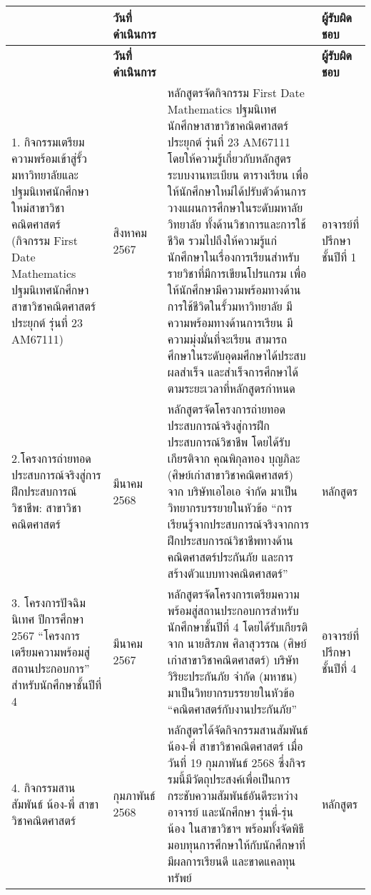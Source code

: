 \begin{longtable}{|>{\raggedright}p{}|>{\centering}p{}|>{\raggedright}p{}|>{\centering\arraybackslash}p{}|}
	\hline
	\centering{\textbf{โครงการ/กิจกรรม}}   & \textbf{วันที่ดำเนินการ} &  \centering{\textbf{ผลการดำเนินงาน}} & \textbf{ผู้รับผิดชอบ}  \\ \hline
	\endfirsthead
	\hline
	\centering{\textbf{โครงการ/กิจกรรม}}   & \textbf{วันที่ดำเนินการ} &  \centering{\textbf{ผลการดำเนินงาน}} & \textbf{ผู้รับผิดชอบ}  \\ \hline
	\endhead
	1.	กิจกรรมเตรียมความพร้อมเข้าสู่รั้วมหาวิทยาลัยและปฐมนิเทศนักศึกษาใหม่สาขาวิชาคณิตศาสตร์ (กิจกรรม First Date Mathematics ปฐมนิเทศนักศึกษาสาขาวิชาคณิตศาสตร์ประยุกต์ รุ่นที่ 23 AM67111)  & 9 สิงหาคม 2567 
	& หลักสูตรจัดกิจกรรม First Date Mathematics ปฐมนิเทศนักศึกษาสาขาวิชาคณิตศาสตร์ประยุกต์ รุ่นที่ 23 AM67111 โดยให้ความรู้เกี่ยวกับหลักสูตร ระบบงานทะเบียน ตารางเรียน  เพื่อให้นักศึกษาใหม่ได้ปรับตัวด้านการวางแผนการศึกษาในระดับมหาลัยวิทยาลัย ทั้งด้านวิชาการและการใช้ชีวิต รวมไปถึงให้ความรู้แก่นักศึกษาในเรื่องการเรียนสำหรับรายวิชาที่มีการเขียนโปรแกรม เพื่อให้นักศึกษามีความพร้อมทางด้านการใช้ชีวิตในรั้วมหาวิทยาลัย มีความพร้อมทางด้านการเรียน มีความมุ่งมั่นที่จะเรียน สามารถศึกษาในระดับอุดมศึกษาได้ประสบผลสำเร็จ และสำเร็จการศึกษาได้ตามระยะเวลาที่หลักสูตรกำหนด & อาจารย์ที่ปรึกษาชั้นปีที่ 1 \\ \hline
	2.โครงการถ่ายทอดประสบการณ์จริงสู่การฝึกประสบการณ์วิชาชีพ: สาขาวิชาคณิตศาสตร์  & 6 มีนาคม 2568 
	&  หลักสูตรจัดโครงการถ่ายทอดประสบการณ์จริงสู่การฝึกประสบการณ์วิชาชีพ โดยได้รับเกียรติจาก คุณพิกุลทอง บุญภิละ (ศิษย์เก่าสาขาวิชาคณิตศาสตร์) จาก บริษัทเอไอเอ จำกัด มาเป็นวิทยากรบรรยายในหัวข้อ ``การเรียนรู้จากประสบการณ์จริงจากการฝึกประสบการณ์วิชาชีพทางด้านคณิตศาสตร์ประกันภัย และการสร้างตัวแบบทางคณิตศาสตร์''
	& หลักสูตร \\ \hline
	3.	โครงการปัจฉิมนิเทศ ปีการศึกษา 2567 ``โครงการเตรียมความพร้อมสู่สถานประกอบการ'' สําหรับนักศึกษาชั้นปีที่ 4  & 7 มีนาคม 2567 & หลักสูตรจัดโครงการเตรียมความพร้อมสู่สถานประกอบการสําหรับนักศึกษาชั้นปีที่ 4 โดยได้รับเกียรติจาก นายสิรภพ ศิลาสุวรรณ (ศิษย์เก่าสาขาวิชาคณิตศาสตร์) บริษัทวิริยะประกันภัย จำกัด (มหาชน) มาเป็นวิทยากรบรรยายในหัวข้อ ``คณิตศาสตร์กับงานประกันภัย''  &  อาจารย์ที่ปรึกษาชั้นปีที่ 4\\ \hline
	4.	กิจกรรมสานสัมพันธ์ น้อง-พี่ สาขาวิชาคณิตศาสตร์   
	& 19 กุมภาพันธ์ 2568 & หลักสูตรได้จัดกิจกรรมสานสัมพันธ์ น้อง-พี่ สาขาวิชาคณิตศาสตร์ เมื่อวันที่ 19 กุมภาพันธ์ 2568 ซึ่งกิจรรมนี้มีวัตถุประสงค์เพื่อเป็นการกระชับความสัมพันธ์อันดีระหว่างอาจารย์ และนักศึกษา รุ่นพี่-รุ่นน้อง ในสาขาวิชาฯ พร้อมทั้งจัดพิธีมอบทุนการศึกษาให้กับนักศึกษาที่มีผลการเรียนดี และขาดแคลทุนทรัพย์ &  หลักสูตร \\ \hline

\end{longtable}
